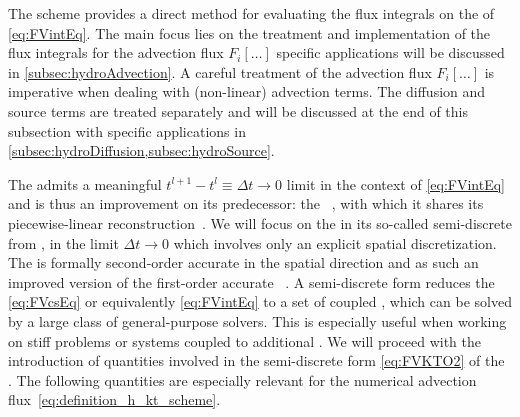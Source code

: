 The \kt{} scheme provides a direct method for evaluating the flux integrals on the \rhs{} of \cref{eq:FVintEq}.
The main focus lies on the treatment and implementation of the flux integrals for the advection flux $F_i[\ldots]$ \dash{} specific applications will be discussed in \cref{subsec:hydroAdvection}.
A careful treatment of the advection flux $F_i[\ldots]$ is imperative when dealing with (non-linear) advection terms.
The diffusion and source terms are treated separately and will be discussed at the end of this subsection with specific applications in \cref{subsec:hydroDiffusion,subsec:hydroSource}.

The \ktScheme{} admits a meaningful ${t^{l+1}-t^l\equiv\Delta t\rightarrow 0}$ limit in the context of \cref{eq:FVintEq} and is thus an improvement on its predecessor: the \ntScheme{}~\cite{NT}, with which it shares its piecewise-linear \muscl{} reconstruction~\cite{MUSCL}.
We will focus on the \ktScheme{} in its so-called semi-discrete from \dash{} \ie{}, in the limit $\Delta t\rightarrow 0$ \dash{} which involves only an explicit spatial discretization.
The \ktScheme{} is formally second-order accurate in the spatial direction and as such an improved version of the first-order accurate \lxfScheme{}~\cite{LxF1,LxF2}.
A semi-discrete form reduces the \pdes{} \eqref{eq:FVcsEq} or equivalently \eqref{eq:FVintEq} to a set of coupled \odes{}, which can be solved by a large class of general-purpose \ode{} solvers.
This is especially useful when working on stiff problems or \pde{} systems coupled to additional \odes{}.
We will proceed with the introduction of quantities involved in the semi-discrete form \eqref{eq:FVKTO2} of the \ktScheme{}.
The following quantities are especially relevant for the numerical advection flux~\eqref{eq:definition_h_kt_scheme}.\bigskip

